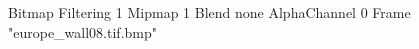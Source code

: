 {Bitmap
	{Filtering 1}
	{Mipmap 1}
	{Blend none}
	{AlphaChannel 0}
	{Frame "europe_wall08.tif.bmp"}
}
